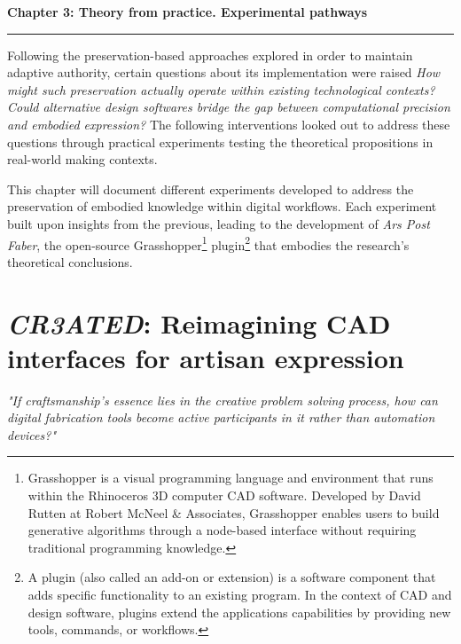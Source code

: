 \clearpage

\setcounter{chapter}{3}
\setcounter{section}{0}


\pagestyle{fancy}
\fancyhf{} 
\fancyfoot[C]{\thepage} 
\renewcommand{\headrulewidth}{0pt}
\renewcommand{\footrulewidth}{0pt}


\noindent
{\Large\textbf{Chapter 3: Theory from practice. Experimental pathways}}
\vspace{0.3cm}
\hrule
\vspace{0.8cm}
\label{ch:experimental_pathways}

\setlength{\parindent}{0pt}
Following the preservation-based approaches explored in order to maintain adaptive authority, certain questions about its implementation were raised \textit{How might such preservation actually operate within existing technological contexts?} \textit{Could alternative design softwares bridge the gap between computational precision and embodied expression?} The following interventions looked out to address these questions through practical experiments testing the theoretical propositions in real-world making contexts.

\vspace{0.5cm}

This chapter will document different experiments developed to address the preservation of embodied knowledge within digital workflows. Each experiment built upon insights from the previous, leading to the development of \textit{Ars Post Faber}, the open-source Grasshopper\footnote{Grasshopper is a visual programming language and environment that runs within the Rhinoceros 3D computer CAD software. Developed by David Rutten at Robert McNeel \& Associates, Grasshopper enables users to build generative algorithms through a node-based interface without requiring traditional programming knowledge.} plugin\footnote{A plugin (also called an add-on or extension) is a software component that adds specific functionality to an existing program. In the context of CAD and design software, plugins extend the applications capabilities by providing new tools, commands, or workflows.} that embodies the research's theoretical conclusions.

\section{\textit{CR3ATED}: Reimagining CAD interfaces for artisan expression}
\textit{"If craftsmanship's essence lies in the creative problem solving process, how can digital fabrication tools become active participants in it rather than automation devices?"}

